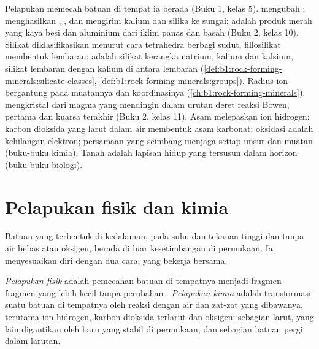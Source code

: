 \begin{recall}
Pelapukan memecah batuan di tempat ia berada (Buku 1, kelas 5).  mengubah ;   menghasilkan , , dan mengirim kalium dan silika ke sungai;  adalah produk merah yang kaya besi dan aluminium dari iklim panas dan basah (Buku 2, kelas 10). Silikat diklasifikasikan menurut cara tetrahedra  berbagi sudut, fillosilikat membentuk lembaran;  adalah silikat kerangka natrium, kalium dan kalsium,  silikat lembaran dengan kalium di antara lembaran (\cref{def:b1:rock-forming-minerals:silicate-classes}, \cref{def:b1:rock-forming-minerals:groups}). Radius ion bergantung pada muatannya dan koordinasinya (\cref{ch:b1:rock-forming-minerals}).  mengkristal dari magma yang mendingin dalam urutan deret reaksi Bowen,  pertama dan kuarsa terakhir (Buku 2, kelas 11). Asam melepaskan ion hidrogen; karbon dioksida yang larut dalam air membentuk asam karbonat; oksidasi adalah kehilangan elektron; persamaan yang seimbang menjaga setiap unsur dan muatan (buku-buku kimia). Tanah adalah lapisan hidup yang tersusun dalam horizon (buku-buku biologi).
\end{recall}

\section{Pelapukan fisik dan kimia}\label{sec:b1:weathering-clays:types}

Batuan yang terbentuk di kedalaman, pada suhu dan tekanan tinggi dan tanpa air bebas atau oksigen, berada di luar kesetimbangan di permukaan. Ia menyesuaikan diri dengan dua cara, yang bekerja bersama.

\begin{definition}\label{def:b1:weathering-clays:weathering}
\emph{Pelapukan fisik} adalah pemecahan batuan di tempatnya menjadi fragmen-fragmen yang lebih kecil tanpa perubahan . \emph{Pelapukan kimia} adalah transformasi  suatu batuan di tempatnya oleh reaksi dengan air dan zat-zat yang dibawanya, terutama ion hidrogen, karbon dioksida terlarut dan oksigen: sebagian  larut, yang lain digantikan oleh  baru yang stabil di permukaan, dan sebagian batuan pergi dalam larutan.
\end{definition}


